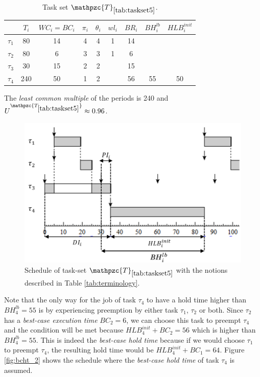\documentclass[fleqn]{article}
\begin{document}
\begin{table}[H]
	\center
	\caption{Task set $\mathpzc{T}_{\ref{tab:taskset5}}$.}
	\label{tab:taskset5}
	\begin{tabular}{c c c c c | c c c c}
		\hline 
		& $T_i$ & $WC_i=BC_i$ & $\pi_i$ & $\theta_i$ &  $wl_i$ & $BR_i$ & $BH^{lb}_i$ & $HLB^{init}_i$\\ 
		\hline 
		$\tau_1$& 80  & 14  & 4 & 4 &  1 & 14 & &\\
		$\tau_2$& 80  & 6   & 3 & 3 &  1 & 6  & &\\ 
		$\tau_3$& 30  & 15  & 2 & 2 &   & 15  & &\\ 
		$\tau_4$& 240 & 50  & 1 & 2 &   & 56  & 55& 50\\
		\hline 
	\end{tabular}
	\small
	\item The \textit{least common multiple} of the periods is 240 and $U^{\mathpzc{T_{\ref{tab:taskset5}}}} \approx 0.96$.
\end{table}

\begin{figure}[H]
	\centering
	\includegraphics[width=0.7\linewidth]{figures/bcht_1}
	\caption{Schedule of task-set $\mathpzc{T}_{\ref{tab:taskset5}}$ with the notions described in Table \ref{tab:terminology}.}
	\label{fig:bcht_1}
\end{figure}

Note that the only way for the job of task $\tau_4$ to have a hold time higher than $BH^{lb}_4=55$ is by experiencing preemption by either task $\tau_1$, $\tau_2$ or both. Since $\tau_2$ has a \textit{best-case execution time} $BC_2=6$, we can choose this task to preempt $\tau_4$ and the condition will be met because $HLB^{init}_4+BC_2= 56$ which is higher than $BH^{lb}_4 = 55$. This is indeed the \textit{best-case hold time} because if we would choose $\tau_1$ to preempt $\tau_4$, the resulting hold time would be $HLB^{init}_4+BC_1= 64$. Figure \ref{fig:bcht_2} shows the schedule where the \textit{best-case hold time} of task $\tau_4$ is assumed.
\end{document}
